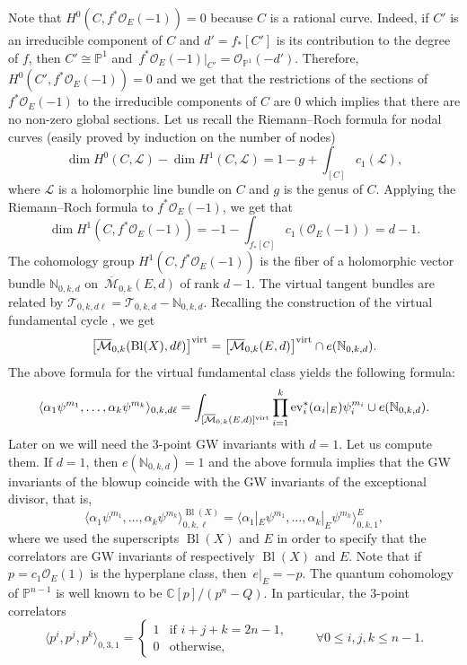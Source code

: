 \documentclass[pdftex]{sigma}
\numberwithin{equation}{section}
\newcommand{\CC}{\mathbb{C}}
\newcommand{\PP}{\mathbb{P}}
\newcommand{\T}{\mathcal{T}}
\renewcommand{\O}{\mathcal{O}}
\newcommand{\M}{\mathcal{M}}
\begin{document}
Note that $H^0(C,f^*\mathcal{O}_E(-1))=0$ because $C$ is a rational curve. Indeed, if $C'$ is an irreducible component of $C$ and $d'=f_*[C']$ is its contribution to the degree of $f$, then $C'\cong \PP^1$ and~$f^*\mathcal{O}_E(-1)|_{C'}= \O_{\PP^1}(-d') $. Therefore, $H^0(C', f^*\mathcal{O}_E(-1))=0$ and we get that the restrictions of the sections of $f^*\O_{E}(-1)$ to the irreducible components of $C$ are $0$ which implies that there are no non-zero global sections. Let us recall the Riemann--Roch formula for nodal curves (easily proved by induction on the number of nodes)
\[
\operatorname{dim} H^0(C,\mathcal{L}) -
\operatorname{dim} H^1(C,\mathcal{L}) = 1-g + \int_{[C]} c_1(\mathcal{L}),
\]
where $\mathcal{L}$ is a holomorphic line bundle on $C$ and $g$ is the genus of $C$. Applying the Riemann--Roch formula to $f^*\O_E(-1)$, we get that
\[
\operatorname{dim} H^1(C, f^*\O_E(-1)) =
-1-\int_{f_*[C]} c_1(\O_E(-1)) = d-1.
\]
The cohomology group $H^1(C, f^*\O_E(-1))$ is the fiber of a holomorphic vector bundle $\mathbb{N}_{0,k,d}$ on~$\overline{\M}_{0,k}(E,d)$ of rank $d-1$. The virtual tangent bundles are related by $\T_{0,k,d\ell} = \T_{0,k,d} -\mathbb{N}_{0,k,d}$. Recalling the construction of the virtual fundamental cycle \cite{BF_intnormalcone}, we get
\[
\big[\overline{\mathcal{M}}_{0,k}(\operatorname{Bl}(X), d\ell)\big]^{\rm virt} =
\big[\overline{\mathcal{M}}_{0,k}(E, d)\big]^{\rm virt} \cap e(\mathbb{N}_{0,k,d}).
\]
The above formula for the virtual fundamental class yields the
following formula:
\[
\langle \alpha_1 \psi^{m_1},\dots, \alpha_k \psi^{m_k}\rangle_{0,k,d\ell} =
\int_{
[\overline{\mathcal{M}}_{0,k}(E, d)]^{\rm virt} }
\prod_{i=1}^k \operatorname{ev}_i^*(\alpha_i|_E) \psi_i^{m_i} \cup e(\mathbb{N}_{0,k,d}).
\]
Later on we will need the 3-point GW invariants with $d=1$. Let us compute them.
If $d=1$, then $e(\mathbb{N}_{0,k,d})=1$ and the above formula implies that the GW invariants of the blowup coincide with the GW invariants of the exceptional divisor, that is,
\[
\langle \alpha_1 \psi^{m_1},\dots, \alpha_k \psi^{m_k}
\rangle_{0,k,\ell}^{\operatorname{Bl}(X)} =
\langle \alpha_1|_E \psi^{m_1},\dots, \alpha_k|_E \psi^{m_k}
\rangle_{0,k,1}^E,
\]
where we used the superscripts $\operatorname{Bl}(X)$ and $E$ in order to specify that the correlators are GW invariants of respectively $\operatorname{Bl}(X)$ and $E$. Note that if $p=c_1\O_E(1)$ is the hyperplane class, then~$e|_{E} =-p$. The quantum cohomology of $\PP^{n-1}$ is well known to be $\CC[p]/(p^n-Q)$. In particular, the 3-point correlators
\[
\big\langle p^i,p^j,p^k\big\rangle_{0,3,1} =
\begin{cases}
1 & \mbox{if } i+j+k=2n-1,\\
0 & \mbox{otherwise},
\end{cases}
\qquad \forall
0\leq i,j,k\leq n-1.
\]
\end{document}
